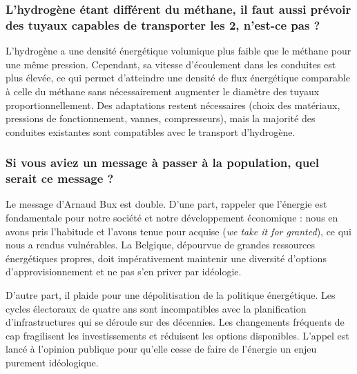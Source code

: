 \subsubsection{L'hydrogène étant différent du méthane, il faut aussi prévoir des tuyaux capables de transporter les 2, n'est-ce pas ?}

L'hydrogène a une densité énergétique volumique plus faible que le méthane pour une même pression. Cependant, sa vitesse d'écoulement dans les conduites est plus élevée, ce qui permet d'atteindre une densité de flux énergétique comparable à celle du méthane sans nécessairement augmenter le diamètre des tuyaux proportionnellement. Des adaptations restent nécessaires (choix des matériaux, pressions de fonctionnement, vannes, compresseurs), mais la majorité des conduites existantes sont compatibles avec le transport d'hydrogène.

\subsubsection{Si vous aviez un message à passer à la population, quel serait ce message ?}

Le message d'Arnaud Bux est double. D'une part, rappeler que l'énergie est fondamentale pour notre société et notre développement économique : nous en avons pris l'habitude et l'avons tenue pour acquise (\textit{we take it for granted}), ce qui nous a rendus vulnérables. La Belgique, dépourvue de grandes ressources énergétiques propres, doit impérativement maintenir une diversité d'options d'approvisionnement et ne pas s'en priver par idéologie.

D'autre part, il plaide pour une dépolitisation de la politique énergétique. Les cycles électoraux de quatre ans sont incompatibles avec la planification d'infrastructures qui se déroule sur des décennies. Les changements fréquents de cap fragilisent les investissements et réduisent les options disponibles. L'appel est lancé à l'opinion publique pour qu'elle cesse de faire de l'énergie un enjeu purement idéologique.